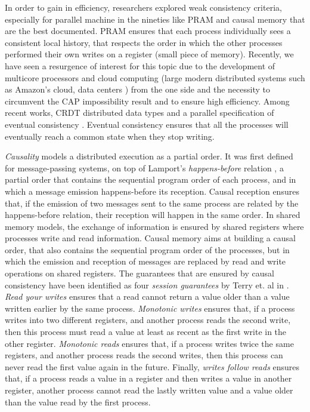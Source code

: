 \documentclass[9pt,numbers]{sigplanconf}
\begin{document}
In order to gain in efficiency, researchers explored weak consistency criteria, especially for parallel machine in the 
nineties like PRAM \cite{lipton1988pram} and causal memory \cite{ahamad1995causal} that are the best documented. 
PRAM ensures that each process individually sees a consistent local history, that respects the order in which the 
other processes performed their own writes on a register (small piece of memory). Recently, we have seen a resurgence of interest for this topic 
due to the development of multicore processors \cite{H09} and cloud computing (large modern distributed systems such 
as Amazon's cloud, data centers \cite{vogels2008eventually}) from the one side and the necessity to circumvent the CAP 
impossibility result and to ensure high efficiency.
Among recent works, CRDT distributed data types \cite{SPBZ11} and a parallel specification of eventual consistency \cite{BGYZ14}. 
Eventual consistency ensures that all the processes will eventually reach a common state when they stop writing.

{\em Causality} models a distributed execution as a partial order. It was first defined for message-passing
systems, on top of Lamport's \emph{happens-before} relation \cite{lamport1978time}, 
a partial order that contains the sequential program order of each process, and in which a message
emission happens-before its reception. Causal reception \cite{birman1987reliable,raynal1991causal}
ensures that, if the emission of two messages sent to the same process are related by the
happens-before relation, their reception will happen in the same order.
In shared memory models, the exchange of information is ensured by
shared registers where processes write and read information. 
Causal memory \cite{ahamad1995causal} aims at building a causal order, 
that also contains the sequential program order of the processes, 
but in which the emission and reception of messages are replaced by
read and write operations on shared registers. 
The guarantees that are ensured by causal consistency have been identified as
four \emph{session guarantees} by Terry et. al in \cite{terry1994session}. 
\emph{Read your writes} ensures that a read cannot return a value older than a
value written earlier by the same process. 
\emph{Monotonic writes} ensures that, if a process writes into two different registers, 
and another process reads the second write, then this process must read a value at 
least as recent as the first write in the other register.
\emph{Monotonic reads} ensures that, if a process writes twice the same registers, 
and another process reads the second writes, then this process can never read the 
first value again in the future.
Finally, \emph{writes follow reads} ensures that, if a process reads a value in a register
and then writes a value in another register, another process cannot read the lastly written
value and a value older than the value read by the first process. 
\end{document}
